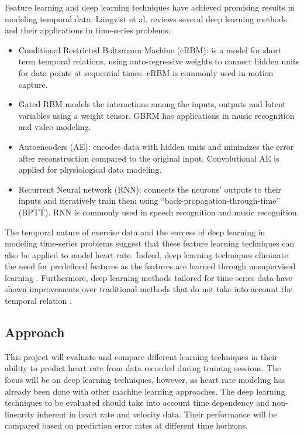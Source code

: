 \documentclass[12pt]{article}
\begin{document}
        Feature learning and deep learning techniques have achieved promising results in modeling temporal data. L{\"a}ngvist et al. \cite{langkvist2014review} reviews several deep learning methods and their  applications in time-series problems:
        \begin{itemize}[label={--}]
            \item Conditional Restricted Boltzmann Machine (cRBM): is a model for short term temporal relations, using auto-regressive weights to connect hidden units for data points at sequential times. cRBM is commonly used in motion capture.
            \item Gated RBM models the interactions among the inputs, outputs and latent variables using a weight tensor. GBRM has applications in music recognition and video modeling.
            \item Autoencoders (AE): encodes data with hidden units and minimizes the error after reconstruction compared to the original input. Convolutional AE is applied for physiological data modeling.
            \item Recurrent Neural network (RNN): connects the neurons' outputs to their inputs and iteratively train them using ``back-propagation-through-time'' (BPTT). RNN is commonly used in speech recognition and music recognition.
            \end{itemize}

        The temporal nature of exercise data and the success of deep learning in modeling time-series problems suggest that these feature learning techniques can also be applied to model heart rate. Indeed, deep learning techniques eliminate the need for predefined features as the features are learned through unsupervised learning \cite{Bengio13representationlearning}. Furthermore, deep learning methods tailored for time series data have shown improvements over traditional methods that do not take into account the temporal relation \cite{Pascanu13DRNN}.

    \subsection{Approach}

    This project will evaluate and compare different learning techniques in their ability to predict heart rate from data recorded during training sessions. The focus will be on deep learning techniques, however, as heart rate modeling has already been done with other machine learning approaches. The deep learning techniques to be evaluated should take into account time dependency and non-linearity inherent in heart rate and velocity data. Their performance will be compared based on prediction error rates at different time horizons.
\end{document}
